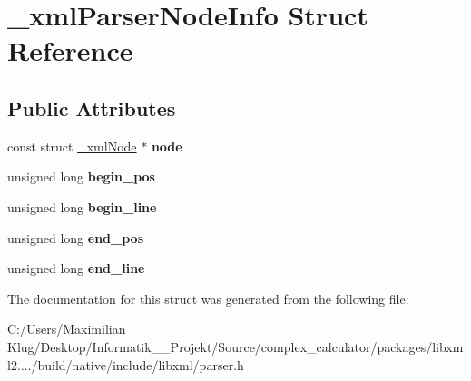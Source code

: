 \hypertarget{struct__xml_parser_node_info}{}\section{\+\_\+xml\+Parser\+Node\+Info Struct Reference}
\label{struct__xml_parser_node_info}
\subsection*{Public Attributes}
\begin{DoxyCompactItemize}
\item 
\mbox{\label{struct__xml_parser_node_info_a046818d3566f725977753bdadfabb139}} 
const struct \mbox{\hyperlink{struct__xml_node}{\+\_\+xml\+Node}} $\ast$ {\bfseries node}
\item 
\mbox{\label{struct__xml_parser_node_info_aac2db2491fa013f83690d76b9a7ceac8}} 
unsigned long {\bfseries begin\+\_\+pos}
\item 
\mbox{\label{struct__xml_parser_node_info_a3448ffcf43452efe92349091c18f7a79}} 
unsigned long {\bfseries begin\+\_\+line}
\item 
\mbox{\label{struct__xml_parser_node_info_a7f3a471cff4019bb37cece9d2d55b863}} 
unsigned long {\bfseries end\+\_\+pos}
\item 
\mbox{\label{struct__xml_parser_node_info_a97d627e7277aea0cca01ba5ca08c93cd}} 
unsigned long {\bfseries end\+\_\+line}
\end{DoxyCompactItemize}


The documentation for this struct was generated from the following file\+:\begin{DoxyCompactItemize}
\item 
C\+:/\+Users/\+Maximilian Klug/\+Desktop/\+Informatik\+\_\+\_\+\+Projekt/\+Source/complex\+\_\+calculator/packages/libxml2..../build/native/include/libxml/parser.\+h\end{DoxyCompactItemize}

